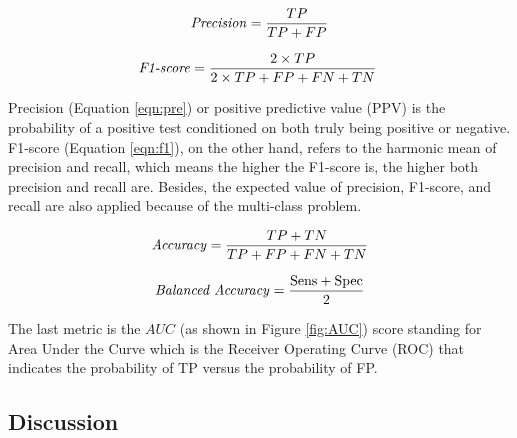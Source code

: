 \documentclass[sensors,article,accept,pdftex,moreauthors]{Definitions/mdpi}
\begin{document}
	\begin{equation}
		\label{eqn:pre}
		\text{\textit{Precision}} = \frac{TP}{TP + FP}
	\end{equation}
	
	\begin{equation}
		\label{eqn:f1}
		\text{\textit{F1-score}} = \frac{2 \times TP}{2 \times TP + FP + FN + TN}\
	\end{equation}
	
	{Precision} %
 (Equation \eqref{eqn:pre}) or positive predictive value (PPV) is the probability of a positive test conditioned on both truly being positive or negative. F1-score (Equation \eqref{eqn:f1}), on the other hand, refers to the harmonic mean of precision and recall, which means the higher the F1-score is, the higher both precision and recall are. Besides, the expected value of precision, F1-score, and recall are also applied because of the multi-class problem.
	
	\begin{equation}
		\label{eqn:acc}
		\text{\textit{Accuracy}} = \frac{TP + TN}{TP + FP + FN + TN}
	\end{equation}
	
	\begin{equation}
		\label{eqn:balacc}
		\text{\textit{Balanced Accuracy}} = \frac{\text{Sens} + \text{Spec}}{2}
	\end{equation}
	
	{The last} %
 metric is the $AUC$ {(as shown in Figure \mbox{\ref{fig:AUC}})} score standing for Area Under the Curve which is the Receiver Operating Curve (ROC) that indicates the probability of TP versus the probability of FP.  
	
	\subsection{Discussion} 

	
\end{document}
